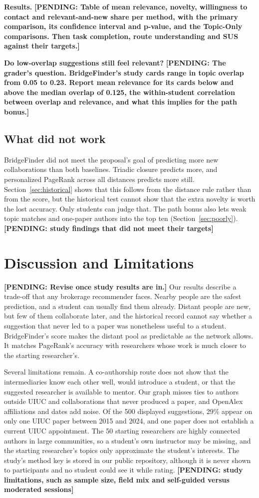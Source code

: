 \documentclass[sigconf,nonacm]{acmart}
\newcommand{\pending}[1]{\textcolor{red!70!black}{\textbf{[PENDING: #1]}}}
\begin{document}
\textbf{Results.} \pending{Table of mean relevance, novelty, willingness to contact and relevant-and-new share per method, with the primary comparison, its confidence interval and p-value, and the Topic-Only comparisons. Then task completion, route understanding and SUS against their targets.}

\textbf{Do low-overlap suggestions still feel relevant?} \pending{The grader's question. BridgeFinder's study cards range in topic overlap from 0.05 to 0.23. Report mean relevance for its cards below and above the median overlap of 0.125, the within-student correlation between overlap and relevance, and what this implies for the path bonus.}

\subsection{What did not work}
BridgeFinder did not meet the proposal's goal of predicting more new collaborations than both baselines. Triadic closure predicts more, and personalized PageRank across all distances predicts more still. Section~\ref{sec:historical} shows that this follows from the distance rule rather than from the score, but the historical test cannot show that the extra novelty is worth the lost accuracy. Only students can judge that. The path bonus also lets weak topic matches and one-paper authors into the top ten (Section~\ref{sec:poorly}). \pending{study findings that did not meet their targets}

\section{Discussion and Limitations}\label{sec:limits}
\pending{Revise once study results are in.} Our results describe a trade-off that any brokerage recommender faces. Nearby people are the safest prediction, and a student can usually find them already. Distant people are new, but few of them collaborate later, and the historical record cannot say whether a suggestion that never led to a paper was nonetheless useful to a student. BridgeFinder's score makes the distant pool as predictable as the network allows. It matches PageRank's accuracy with researchers whose work is much closer to the starting researcher's.

Several limitations remain. A co-authorship route does not show that the intermediaries know each other well, would introduce a student, or that the suggested researcher is available to mentor. Our graph misses ties to authors outside UIUC and collaborations that never produced a paper, and OpenAlex affiliations and dates add noise. Of the 500 displayed suggestions, 29\% appear on only one UIUC paper between 2015 and 2024, and one paper does not establish a current UIUC appointment. The 50 starting researchers are highly connected authors in large communities, so a student's own instructor may be missing, and the starting researcher's topics only approximate the student's interests. The study's method key is stored in our public repository, although it is never shown to participants and no student could see it while rating. \pending{study limitations, such as sample size, field mix and self-guided versus moderated sessions}
\end{document}
